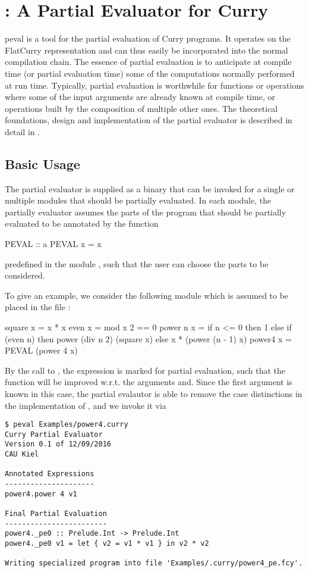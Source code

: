 \section{: A Partial Evaluator for Curry}
\label{sec-peval}

peval
is a tool for the partial evaluation of Curry programs.
It operates on the FlatCurry representation and can thus
easily be incorporated into the normal compilation chain.
The essence of partial evaluation is to anticipate at compile time
(or partial evaluation time) some of the computations
normally performed at run time.
Typically, partial evaluation is worthwhile for functions or
operations where some of the input arguments are already known at compile time,
or operations built by the composition of multiple other ones.
The theoretical foundations, design and implementation of
the partial evaluator is described in detail in \cite{Peemoeller2016}.

\subsection{Basic Usage}

The partial evaluator is supplied as a binary that can be invoked
for a single or multiple modules that should be partially evaluated.
In each module, the partially evaluator assumes the parts of the program
that should be partially evaluated to be annotated by the function
\begin{curry}
PEVAL :: a
PEVAL x = x
\end{curry}
predefined in the module ,
such that the user can choose the parts to be considered.

To give an example, we consider the following module which is assumed
to be placed in the file :
\begin{curry}
square  x = x * x
even    x = mod x 2 == 0
power n x = if n <= 0 then 1
                      else if (even n) then power (div n 2) (square x)
                                       else x * (power (n - 1) x)
power4  x = PEVAL (power 4 x)
\end{curry}
By the call to , the expression 
is marked for partial evaluation, such that the function 
will be improved w.r.t. the arguments  and.
Since the first argument is known in this case,
the partial evalautor is able to remove the case distinctions
in the implementation of , and we invoke it via
\begin{lstlisting}[mathescape=false]
$ peval Examples/power4.curry
Curry Partial Evaluator
Version 0.1 of 12/09/2016
CAU Kiel

Annotated Expressions
---------------------
power4.power 4 v1

Final Partial Evaluation
------------------------
power4._pe0 :: Prelude.Int -> Prelude.Int
power4._pe0 v1 = let { v2 = v1 * v1 } in v2 * v2

Writing specialized program into file 'Examples/.curry/power4_pe.fcy'.
\end{lstlisting}

